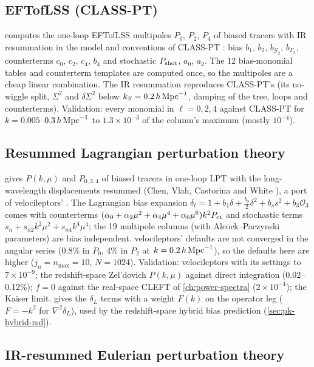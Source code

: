 \subsection{EFTofLSS (CLASS-PT)}

 computes the one-loop EFTofLSS multipoles $P_0$, $P_2$, $P_4$ of biased tracers with IR resummation in
the model and conventions of CLASS-PT \cite{Ivanov2020,Chudaykin2020}: bias $b_1$, $b_2$, $b_{\mathcal G_2}$,
$b_{\Gamma_3}$, counterterms $c_0$, $c_2$, $c_4$, $b_4$ and stochastic $P_{\rm shot}$, $a_0$, $a_2$. The 12 bias-monomial
tables and counterterm templates are computed once, so the multipoles are a cheap linear combination. The IR
resummation reproduces CLASS-PT's (its no-wiggle split, $\Sigma^2$ and $\delta\Sigma^2$ below $k_S=0.2\,h\,\mathrm{Mpc}^{-1}$, damping of the
tree, loops and counterterms). Validation: every monomial in $\ell=0,2,4$ against CLASS-PT for $k=0.005$--$0.3\,h\,\mathrm{Mpc}^{-1}$ to
$1.3\times10^{-3}$ of the column's maximum (mostly $10^{-4}$).

\subsection{Resummed Lagrangian perturbation theory}

 gives $P(k,\mu)$ and $P_{0,2,4}$ of biased tracers in one-loop LPT with the long-wavelength
displacements resummed (Chen, Vlah, Castorina and White \cite{Chen2021}), a port of velocileptors'
. The Lagrangian bias expansion $\delta_t=1+b_1\delta+\frac{b_2}{2}\delta^2+b_ss^2+b_3\mathcal O_3$ comes
with counterterms $(\alpha_0+\alpha_2\mu^2+\alpha_4\mu^4+\alpha_6\mu^6)k^2P_{\rm ct}$ and stochastic terms
$s_n+s_{n2}k^2\mu^2+s_{n4}k^4\mu^4$; the 19 multipole columns (with Alcock--Paczynski parameters) are bias independent.
velocileptors' defaults are not converged in the angular series (0.8\% in $P_0$, 4\% in $P_2$ at $k=0.2\,h\,\mathrm{Mpc}^{-1}$), so the
defaults here are higher ($j_n=n_{\max}=10$, $N=1024$). Validation: velocileptors with its settings to $7\times10^{-9}$;
the redshift-space Zel'dovich $P(k,\mu)$ against direct integration (0.02--0.12\%); $f=0$ against the real-space CLEFT of
\cref{ch:power-spectra} ($2\times10^{-4}$); the Kaiser limit.  gives the $\delta_L$ terms with a
weight $F(k)$ on the operator leg ($F=-k^2$ for $\nabla^2\delta_L$), used by the redshift-space hybrid bias prediction
(\cref{sec:pk-hybrid-rsd}).

\subsection{IR-resummed Eulerian perturbation theory}

